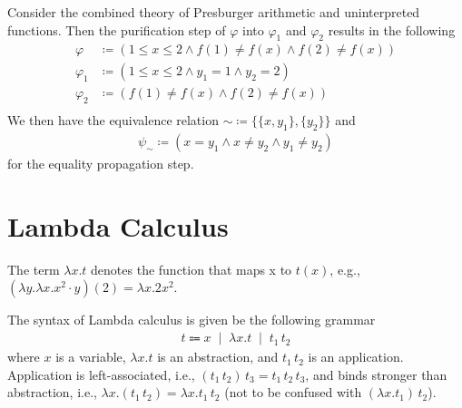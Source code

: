 \begin{example}
    Consider the combined theory of Presburger arithmetic and uninterpreted functions.
    Then the purification step of $\varphi$ into $\varphi_1$ and $\varphi_2$ results in the following
    \begin{align*}
        \varphi&\coloneqq (1\leq x\leq 2\land f(1)\neq f(x) \land f(2)\neq f(x)) \\
        \varphi_1&\coloneqq (1\leq x\leq 2\land y_1=1 \land y_2=2) \\
         \varphi_2&\coloneqq ( f(1)\neq f(x) \land f(2)\neq f(x)) \\
    \end{align*}
    We then have the equivalence relation $\sim\coloneqq \{\{x,y_1\}, \{y_2\}\}$ and 
    \begin{align*}
        \psi_{\sim}\coloneqq (x=y_1\land x\neq y_2 \land y_1\neq y_2)
    \end{align*}
    for the equality propagation step.
\end{example}





\section{Lambda Calculus}

\begin{remark}
    The term $\lambda x.t$ denotes the function that maps x to $t(x)$, e.g., $(\lambda y. \lambda x. x^2 \cdot y)(2) = \lambda x.2x^2$.
\end{remark}

\begin{definition}
    The syntax of Lambda calculus is given be the following grammar
    \begin{align*}
        t\Coloneqq x \; \mid \; \lambda x.t \; \mid \;  t_1 \, t_2
    \end{align*}
    where $x$ is a variable, $\lambda x.t $ is an abstraction, and $ t_1 \, t_2$ is an application. Application is left-associated, i.e., $(t_1 \, t_2)\, t_3 = t_1 \, t_2 \, t_3$, and binds stronger than abstraction, i.e., $\lambda x.(t_1 \, t_2)=\lambda x. t_1 \, t_2$ (not to be confused with $(\lambda x.t_1) \, t_2$).
\end{definition}


